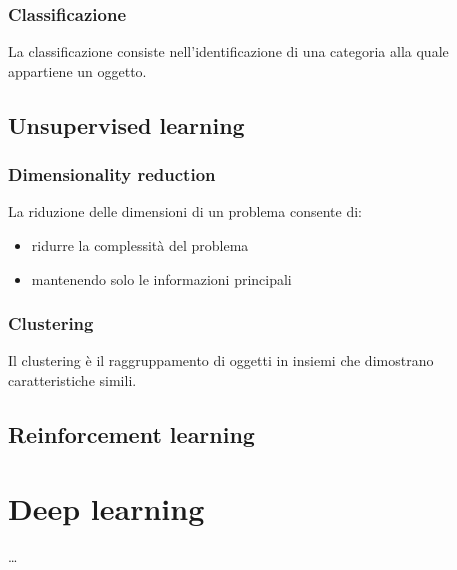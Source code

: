 \subsubsection{Classificazione}
La classificazione consiste nell'identificazione di una categoria alla quale appartiene un oggetto.


\subsection{Unsupervised learning}

\subsubsection{Dimensionality reduction}
La riduzione delle dimensioni di un problema consente di:
\begin{itemize}
    \item ridurre la complessità del problema
    \item mantenendo solo le informazioni principali
\end{itemize}

\begin{example}
\end{example}

\subsubsection{Clustering}
Il clustering è il raggruppamento di oggetti in insiemi che dimostrano caratteristiche simili.


\subsection{Reinforcement learning}

\section{Deep learning}
\dots




